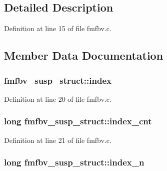 \subsection{Detailed Description}


Definition at line 15 of file fmfbv.\+c.



\subsection{Member Data Documentation}
\subsubsection[{\texorpdfstring{index}{index}}]{ fmfbv\+\_\+susp\+\_\+struct\+::index}\hypertarget{structfmfbv__susp__struct_a001af995c72790aad5a1e5cf75c85286}{}\label{structfmfbv__susp__struct_a001af995c72790aad5a1e5cf75c85286}


Definition at line 20 of file fmfbv.\+c.

\subsubsection[{\texorpdfstring{index\+\_\+cnt}{index_cnt}}]{\setlength{\rightskip}{0pt plus 5cm}long fmfbv\+\_\+susp\+\_\+struct\+::index\+\_\+cnt}\hypertarget{structfmfbv__susp__struct_aa5aebe19152079f09f909233b814f7b2}{}\label{structfmfbv__susp__struct_aa5aebe19152079f09f909233b814f7b2}


Definition at line 21 of file fmfbv.\+c.

\subsubsection[{\texorpdfstring{index\+\_\+n}{index_n}}]{\setlength{\rightskip}{0pt plus 5cm}long fmfbv\+\_\+susp\+\_\+struct\+::index\+\_\+n}\hypertarget{structfmfbv__susp__struct_a8f299c777ed1975920ae8e7dc28e0174}{}\label{structfmfbv__susp__struct_a8f299c777ed1975920ae8e7dc28e0174}


